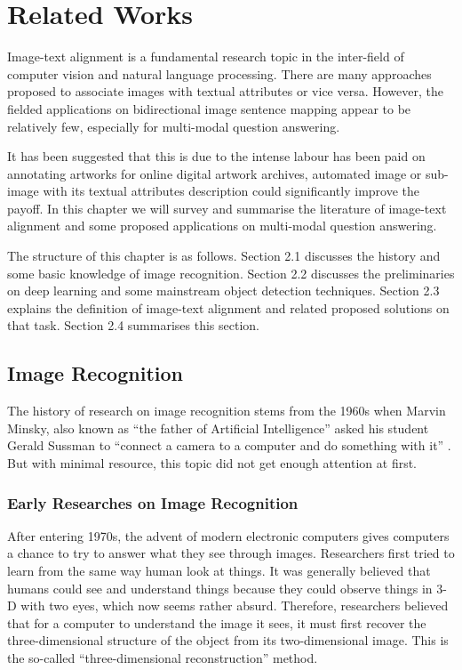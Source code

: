 \chapter{Related Works}
\label{cha:relatedworks}
Image-text alignment is a fundamental research topic in the inter-field of computer vision and natural language processing. There are many approaches proposed to associate images with textual attributes or vice versa. However, the fielded applications on bidirectional image sentence mapping appear to be relatively few, especially for multi-modal question answering. 

It has been suggested that this is due to the intense labour has been paid on annotating artworks for online digital artwork archives, automated image or sub-image with its textual attributes description could significantly improve the payoff. In this chapter we will survey and summarise the literature of image-text alignment and some proposed applications on multi-modal question answering.

The structure of this chapter is as follows. Section 2.1 discusses the history and some basic knowledge of image recognition. Section 2.2 discusses the preliminaries on deep learning and some mainstream object detection techniques. Section 2.3 explains the definition of image-text alignment and related proposed solutions on that task. Section 2.4 summarises this section.

\section{Image Recognition}
The history of research on image recognition stems from the 1960s when Marvin Minsky, also known as ``the father of Artificial Intelligence'' asked his student Gerald Sussman to ``connect a camera to a computer and do something with it'' \cite{hill}. But with minimal resource, this topic did not get enough attention at first. 

\subsection{Early Researches on Image Recognition}

After entering 1970s, the advent of modern electronic computers gives computers a chance to try to answer what they see through images. Researchers first tried to learn from the same way human look at things. It was generally believed that humans could see and understand things because they could observe things in 3-D with two eyes, which now seems rather absurd. Therefore, researchers believed that for a computer to understand the image it sees, it must first recover the three-dimensional structure of the object from its two-dimensional image. This is the so-called ``three-dimensional reconstruction'' method.

